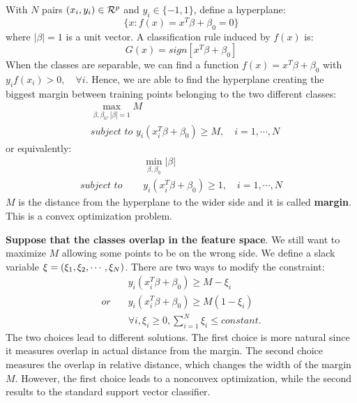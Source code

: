 \subsubsection{}
With $N$ pairs $(x_i, y_i) \in \CMcal{R}^p$ and $y_i \in \{-1, 1\}$, define a hyperplane:
\begin{equation}
\{x: f(x) = x^T\beta+ \beta_0=0\}
\end{equation}
where $\left|\beta\right|=1$ is a unit vector. A classification rule induced by $f(x)$ is:
\begin{equation}
G(x) = sign\left[x^T\beta+\beta_0\right]
\end{equation}
When the classes are separable, we can find a function $f(x)=x^T\beta+\beta_0$ with $y_if(x_i)>0, \quad \forall i$. Hence, we are able to find the hyperplane creating the biggest margin between training points belonging to the two different classes:
\begin{equation}
\begin{aligned}
&\max_{\beta, \beta_0,\left|\beta\right|=1} M\\
&\textit{subject to } y_i(x_i^T\beta+\beta_0)\ge M,\quad i=1,\cdots,N
\end{aligned}
\end{equation}
or equivalently:
\begin{equation}
\begin{aligned}
&\min_{\beta, \beta_0} \left|\beta\right|\\
\textit{subject to } \quad&y_i(x_i^T\beta+\beta_0)\ge 1,\quad i=1,\cdots,N
\end{aligned}
\end{equation}
$M$ is the distance from the hyperplane to the wider side and it is called \textbf{margin}. This is a convex optimization problem.


\textbf{Suppose that the classes overlap in the feature space}. We still want to maximize $M$ allowing some points to be on the wrong side. We define a slack variable $\xi=\left(\xi_1, \xi_2, \cdots, \xi_N\right)$. There are two ways to modify the constraint:
\begin{equation}
\begin{aligned}
&y_i (x_i^T\beta+\beta_0)\ge M -\xi_i\\
\textit{or} \quad&y_i (x_i^T\beta+\beta_0)\ge M (1-\xi_i)\\
&\forall i, \xi_i\ge  0, \sum_{i=1}^N \xi_i \le constant.
\end{aligned}
\end{equation}
The two choices lead to different solutions. The first choice is more natural since it measures overlap in actual distance from the margin. The second choice measures the overlap in relative distance, which changes the width of the margin $M$. However, the first choice leads to a nonconvex optimization, while the second results to the standard support vector classifier.


